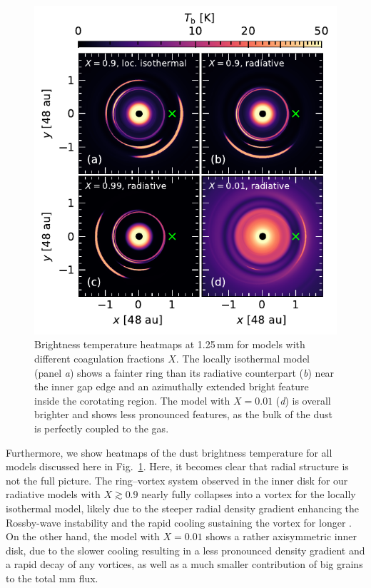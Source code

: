 \documentclass[fleqn,usenatbib,useAMS]{mnras}
\begin{document}
\begin{figure}
	\centering
	\includegraphics[width=\columnwidth]{compare-X.pdf}
	\caption{Brightness temperature heatmaps at 1.25\,mm for models with different coagulation fractions $X$. The locally isothermal model (panel \emph{a}) shows a fainter ring than its radiative counterpart (\emph{b}) near the inner gap edge and an azimuthally extended bright feature inside the corotating region. The model with $X=0.01$ (\emph{d}) is overall brighter and shows less pronounced features, as the bulk of the dust is perfectly coupled to the gas.}
	\label{fig:compare-X}
\end{figure}
%
Furthermore, we show heatmaps of the dust brightness temperature for all models discussed here in Fig.~\ref{fig:compare-X}. Here, it becomes clear that radial structure is not the full picture. The ring--vortex system observed in the inner disk for our radiative models with $X\gtrsim0.9$ nearly fully collapses into a vortex for the locally isothermal model, likely due to the steeper radial density gradient enhancing the Rossby-wave instability \citep{lovelace-1999} and the rapid cooling sustaining the vortex for longer \citep{rometsch-etal-2021,fung-ono-2021}. On the other hand, the model with $X=0.01$ shows a rather axisymmetric inner disk, due to the slower cooling resulting in a less pronounced density gradient and a rapid decay of any vortices, as well as a much smaller contribution of big grains to the total mm flux.
\end{document}
